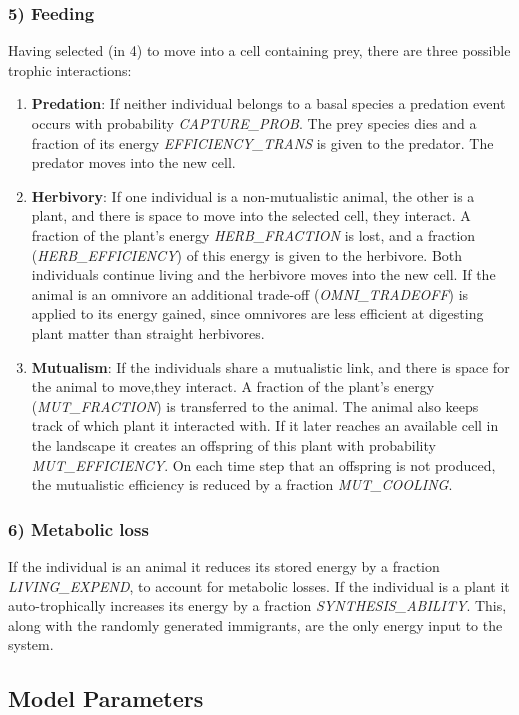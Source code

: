 \subsubsection*{5) Feeding}
Having selected (in 4) to move into a cell containing prey, there are three possible trophic interactions:

\begin{enumerate}
	\item \textbf{Predation}: If neither individual belongs to a basal species a predation event occurs with probability \emph{CAPTURE\_PROB}. The prey species dies and a fraction of its energy \emph{EFFICIENCY\_TRANS} is given to the predator. The predator moves into the new cell.
	\item \textbf{Herbivory}: If one individual is a non-mutualistic animal, the other is a plant, and there is space to move into the selected cell, they interact. A fraction of the plant's energy \emph{HERB\_FRACTION} is lost, and a fraction (\emph{HERB\_EFFICIENCY}) of this energy is given to the herbivore. Both individuals continue living and the herbivore moves into the new cell. If the animal is an omnivore an additional trade-off (\emph{OMNI\_TRADEOFF}) is applied to its energy gained, since omnivores are less efficient at digesting plant matter than straight herbivores.   
	\item \textbf{Mutualism}: If the individuals share a mutualistic link, and there is space for the animal to move,they interact. A fraction of the plant's energy (\emph{MUT\_FRACTION}) is transferred to the animal. The animal also keeps track of which plant it interacted with. If it later reaches an available cell in the landscape it creates an offspring of this plant with probability \emph{MUT\_EFFICIENCY}. On each time step that an offspring is not produced, the mutualistic efficiency is reduced by a fraction \emph{MUT\_COOLING}.  
\end{enumerate}  

\subsubsection*{6) Metabolic loss}
If the individual is an animal it reduces its stored energy by a fraction \emph{LIVING\_EXPEND}, to account for metabolic losses. If the individual is a plant it auto-trophically increases its energy by a fraction \emph{SYNTHESIS\_ABILITY}. This, along with the randomly generated immigrants, are the only energy input to the system.


\subsection{Model Parameters}
\label{sec:parameters}

